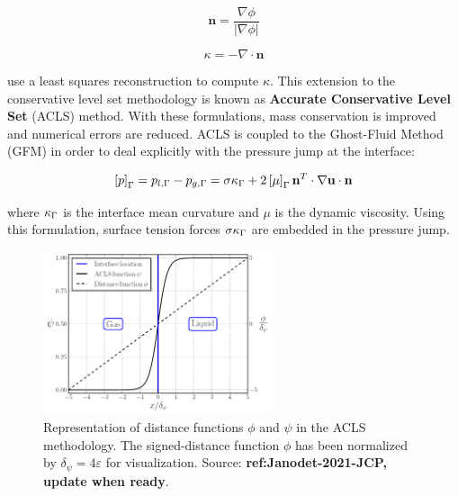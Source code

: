 \begin{equation}
\textbf{n} = \frac{\nabla \phi}{| \nabla \phi |} 
\end{equation}

\begin{equation}
\kappa = - \nabla \cdot \textbf{n}
\end{equation}

 use a least squares reconstruction to compute $\kappa$. This extension to the conservative level set methodology is known as \textbf{Accurate Conservative Level Set} (ACLS) method. With these formulations, mass conservation is improved and numerical errors are reduced. ACLS is coupled to the Ghost-Fluid Method (GFM)  in order to deal explicitly with the pressure jump at the interface:

\begin{equation}
    \left[ p \right]_{\scriptsize{\Gamma}} = p_{l,{\scriptsize{\Gamma}}} - p_{g,{\scriptsize{\Gamma}}}  = \sigma \kappa_{\scriptsize{\Gamma}} + 2 \left[ \mu \right]_{\scriptsize{\Gamma}} \textbf{n}^T \cdot \nabla \textbf{u} \cdot \textbf{n}
\end{equation}

where $\kappa_{\scriptsize{\Gamma}}$ is the interface mean curvature and $\mu$ is the dynamic viscosity. Using this formulation, surface tension forces $\sigma\kappa_{\scriptsize{\Gamma}}$ are embedded in the pressure jump. \\

\begin{figure}[ht]
    \centering
    \includegraphics[width=0.6\textwidth]{./part1_numerical_approaches/figures_ch2/ACLS_psi_phi_janodet_JCP}
       \centering
    \caption[Representation of distance functions $\phi$ and $\psi$ in the ACLS methodology]{Representation of distance functions $\phi$ and $\psi$ in the ACLS methodology. The signed-distance function $\phi$ has been normalized by $\delta_\psi = 4\varepsilon$ for visualization. Source: \textbf{ref:Janodet-2021-JCP, update when ready}.}
    \label{fig:psi_phi_profiles_janodet_2021_JCP}
\end{figure}



